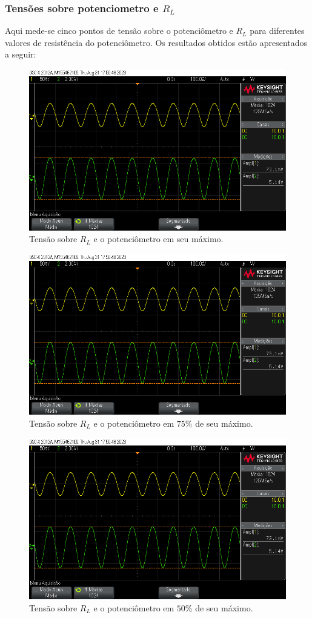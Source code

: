 \subsubsection{Tensões sobre potenciometro e $R_L$}

Aqui mede-se cinco pontos de tensão sobre o potenciômetro e $R_L$ para diferentes valores de resistência do potenciômetro. Os resultados obtidos estão apresentados a seguir:

\begin{figure}[H]
    \centering
    \includegraphics[width=0.5\columnwidth]{images/v_pot1.png}
    \caption{Tensão sobre $R_L$ e o potenciômetro em seu máximo.}
\end{figure}

\begin{figure}[H]
    \centering
    \includegraphics[width=0.5\columnwidth]{images/v_pot1.png}
    \caption{Tensão sobre $R_L$ e o potenciômetro em $75\%$ de seu máximo.}
\end{figure}

\begin{figure}[H]
    \centering
    \includegraphics[width=0.5\columnwidth]{images/v_pot1.png}
    \caption{Tensão sobre $R_L$ e o potenciômetro em $50\%$ de seu máximo.}
\end{figure}

